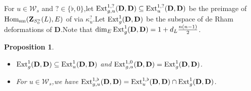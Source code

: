 \documentclass[10pt]{article}
\newtheorem{pro}[thm]{Proposition}
\newcommand{\homo}{{\rm Hom}}
\newcommand{\ext}{{\rm Ext}}
\newcommand{\sm}{{\rm sm}}
\newcommand{\Dpik}{{\mathbf{D}}}
\newcommand{\bZ}{{\mathbf{Z}}}
\newcommand{\sW}{\mathscr W}
\begin{document}



For $u\in \sW_{s}$ and $?\in\{\flat,0\}$,\;let  $\ext^{1,?}_{g,u}(\Dpik,\Dpik)\subseteq\ext^{1,?}_{u}(\Dpik,\Dpik)$  be the preimage of $\homo_{\sm}(\bZ_{S^u_0}(L),E)$ of via $\kappa^{?}_u$.\;Let $\ext^1_g(\Dpik,\Dpik)$ be the subspace of de Rham deformations of $\Dpik$.\;Note that $\dim_E{\ext}^{1}_g(\Dpik,\Dpik)=1+d_L\frac{n(n-1)}{2}$.\;
\begin{pro}\label{studyforkerkappau}
\begin{itemize}
	\item[(1)] $\ext^1_g(\Dpik,\Dpik)\subseteq \ext^{1}_{u}(\Dpik,\Dpik)$ and $\ext^{1,0}_{g,u}(\Dpik,\Dpik)=\ext^{1}_{g}(\Dpik,\Dpik)$.\;
	\item[(2)] For $u\in \sW_{s}$,\;we have $\ext^{1,\flat}_{g,u}(\Dpik,\Dpik)=\ext^{1,\flat}_{u}(\Dpik,\Dpik)\cap \ext^1_g(\Dpik,\Dpik)$.\;
\end{itemize}
	\end{pro}
\end{document}
